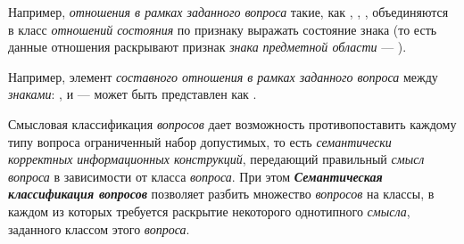 Например, \textit{отношения в рамках заданного вопроса} такие, как , , , объединяются в класс \textit{отношений состояния} по признаку выражать состояние знака (то есть данные отношения раскрывают признак \textit{знака} \textit{предметной области} --- ).

\begin{SCn}
\end{SCn}

Например, элемент \textit{составного отношения в рамках заданного вопроса} между \textit{знаками}: ,  и  --- может быть представлен как .

Смысловая классификация \textit{вопросов} дает возможность противопоставить каждому типу вопроса ограниченный набор допустимых, то есть \textit{семантически корректных информационных конструкций}, передающий правильный \textit{смысл} \textit{вопроса} в зависимости от класса \textit{вопроса}. При этом \textbf{\textit{Семантическая классификация вопросов}} позволяет разбить множество \textit{вопросов} на классы, в каждом из которых требуется раскрытие некоторого однотипного \textit{смысла}, заданного классом этого \textit{вопроса}. 

